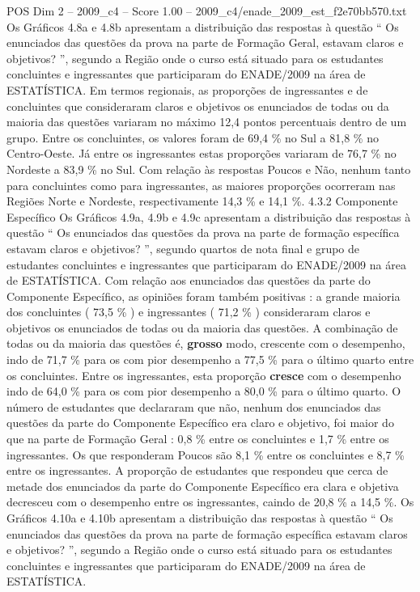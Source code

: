 \begin{textsample}{POS Dim 2 – 2009\_c4 – Score 1.00 – 2009\_c4/enade\_2009\_est\_f2e70bb570.txt}
Os Gráficos 4.8a e 4.8b apresentam a distribuição das respostas à questão “ Os enunciados das questões da prova na parte de Formação Geral, estavam claros e objetivos? ”, segundo a Região onde o curso está situado para os estudantes concluintes e ingressantes que participaram do ENADE/2009 na área de ESTATÍSTICA.
Em termos regionais, as proporções de ingressantes e de concluintes que consideraram claros e objetivos os enunciados de todas ou da maioria das questões variaram no máximo 12,4 pontos percentuais dentro de um grupo.
Entre os concluintes, os valores foram de 69,4 \% no Sul a 81,8 \% no Centro-Oeste.
Já entre os ingressantes estas proporções variaram de 76,7 \% no Nordeste a 83,9 \% no Sul.
Com relação às respostas Poucos e Não, nenhum tanto para concluintes como para ingressantes, as maiores proporções ocorreram nas Regiões Norte e Nordeste, respectivamente 14,3 \% e 14,1 \%. 4.3.2 Componente Específico Os Gráficos 4.9a, 4.9b e 4.9c apresentam a distribuição das respostas à questão “ Os enunciados das questões da prova na parte de formação específica estavam claros e objetivos? ”, segundo quartos de nota final e grupo de estudantes concluintes e ingressantes que participaram do ENADE/2009 na área de ESTATÍSTICA.
Com relação aos enunciados das questões da parte do Componente Específico, as opiniões foram também positivas : a grande maioria dos concluintes ( 73,5 \% ) e ingressantes ( 71,2 \% ) consideraram claros e objetivos os enunciados de todas ou da maioria das questões.
A combinação de todas ou da maioria das questões é, \textbf{grosso} modo, crescente com o desempenho, indo de 71,7 \% para os com pior desempenho a 77,5 \% para o último quarto entre os concluintes.
Entre os ingressantes, esta proporção \textbf{cresce} com o desempenho indo de 64,0 \% para os com pior desempenho a 80,0 \% para o último quarto.
O número de estudantes que declararam que não, nenhum dos enunciados das questões da parte do Componente Específico era claro e objetivo, foi maior do que na parte de Formação Geral : 0,8 \% entre os concluintes e 1,7 \% entre os ingressantes.
Os que responderam Poucos são 8,1 \% entre os concluintes e 8,7 \% entre os ingressantes.
A proporção de estudantes que respondeu que cerca de metade dos enunciados da parte do Componente Específico era clara e objetiva decresceu com o desempenho entre os ingressantes, caindo de 20,8 \% a 14,5 \%.
Os Gráficos 4.10a e 4.10b apresentam a distribuição das respostas à questão “ Os enunciados das questões da prova na parte de formação específica estavam claros e objetivos? ”, segundo a Região onde o curso está situado para os estudantes concluintes e ingressantes que participaram do ENADE/2009 na área de ESTATÍSTICA.

\end{textsample}
